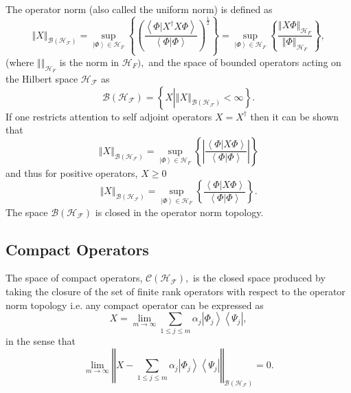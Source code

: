 \documentclass[aps,preprint]{revtex4}%
\begin{document}
The operator norm (also called the uniform norm) is defined as
\begin{equation}
\left\Vert X\right\Vert _{\mathcal{B}\left(  \mathcal{H}_{\mathcal{F}}\right)
}=\sup_{\left\vert \Phi\right\rangle \in\mathcal{H}_{F}}\left\{  \left(
\frac{\left\langle \left.  \Phi\right\vert X^{\dagger}X\Phi\right\rangle
}{\left\langle \left.  \Phi\right\vert \Phi\right\rangle }\right)  ^{\frac
{1}{2}}\right\}  =\sup_{\left\vert \Phi\right\rangle \in\mathcal{H}_{F}%
}\left\{  \frac{\left\Vert X\Phi\right\Vert _{\mathcal{H}_{F}}}{\left\Vert
\Phi\right\Vert _{\mathcal{H}_{F}}}\right\}  ,
\end{equation}
(where $\left\Vert {}\right\Vert _{\mathcal{H}_{F}}$ is the norm in
$\mathcal{H}_{F}),$ and the space of bounded operators acting on the Hilbert
space $\mathcal{H}_{\mathcal{F}}$ as
\begin{equation}
\mathcal{B}\left(  \mathcal{H}_{\mathcal{F}}\right)  =\left\{  X\left\vert
\left\Vert X\right\Vert _{\mathcal{B}\left(  \mathcal{H}_{\mathcal{F}}\right)
}<\infty\right.  \right\}  .
\end{equation}
If one restricts attention to self adjoint operators $X=X^{\dagger}$ then it
can be shown that
\begin{equation}
\left\Vert X\right\Vert _{\mathcal{B}\left(  \mathcal{H}_{\mathcal{F}}\right)
}=\sup_{\left\vert \Phi\right\rangle \in\mathcal{H}_{F}}\left\{  \left\vert
\frac{\left\langle \left.  \Phi\right\vert X\Phi\right\rangle }{\left\langle
\left.  \Phi\right\vert \Phi\right\rangle }\right\vert \right\}
\end{equation}
and thus for positive operators, $X\geq0$%
\begin{equation}
\left\Vert X\right\Vert _{\mathcal{B}\left(  \mathcal{H}_{\mathcal{F}}\right)
}=\sup_{\left\vert \Phi\right\rangle \in\mathcal{H}_{F}}\left\{
\frac{\left\langle \left.  \Phi\right\vert X\Phi\right\rangle }{\left\langle
\left.  \Phi\right\vert \Phi\right\rangle }\right\}  .
\end{equation}
The space $\mathcal{B}\left(  \mathcal{H}_{\mathcal{F}}\right)  $ is closed in
the operator norm topology.

\subsection{Compact Operators}

The space of compact operators, $\mathcal{C}\left(  \mathcal{H}_{\mathcal{F}%
}\right)  ,$ is the closed space produced by taking the closure of the set of
finite rank operators with respect to the operator norm topology i.e. any
compact operator can be expressed as
\begin{equation}
X=\lim_{m\rightarrow\infty}\sum_{1\leq j\leq m}\alpha_{j}\left\vert \Phi
_{j}\right\rangle \left\langle \Psi_{j}\right\vert ,
\end{equation}
in the sense that
\begin{equation}
\lim_{m\rightarrow\infty}\left\Vert X-\sum_{1\leq j\leq m}\alpha_{j}\left\vert
\Phi_{j}\right\rangle \left\langle \Psi_{j}\right\vert \right\Vert
_{\mathcal{B}\left(  \mathcal{H}_{\mathcal{F}}\right)  }=0.
\end{equation}
\end{document}
